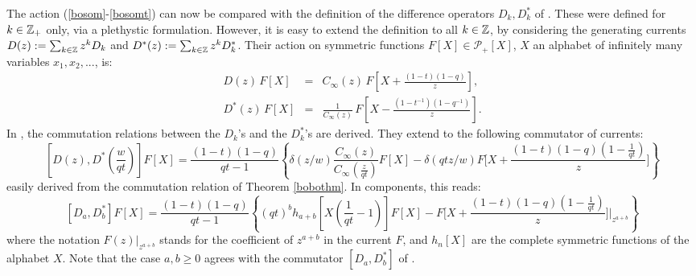 The action (\ref{bosom}-\ref{bosomt}) can now be compared with the definition of the difference operators $D_k,D_k^*$ of \cite {BGLX}. These were 
defined for $k\in {\mathbb Z}_+$ only, via a plethystic formulation. However, it is easy to extend the definition to
all $k\in {\mathbb Z}$, by considering the  
generating currents $D(z):=\sum_{k\in {\mathbb Z}} z^k D_k$ and $D^*(z):=\sum_{k\in {\mathbb Z}} z^k D_k^*$. 
Their action on symmetric functions $F[X]\in {\mathcal P}_+[X]$, $X$
an alphabet
of infinitely many variables $x_1,x_2,...$, is:
\begin{eqnarray}
D(z)\, F[X]&=&C_\infty(z)\, F\left[X+\frac{(1-t)(1-q)}{z}\right] \label{fromBG}, \\
D^*(z)\, F[X]&=&\frac{1}{C_\infty(z)}\, F\left[X-\frac{(1-t^{-1})(1-q^{-1})}{z}\right] .\label{fromBGstar} 
\end{eqnarray}
In \cite{BGLX}, the commutation relations between the $D_k$'s and the $D_k^*$'s are derived. 
They extend to the following commutator of currents:
\begin{equation}\label{BGcurrent}
[D(z),D^*(\frac{w}{q t})]F[X]=
\frac{(1-t)(1-q)}{q t-1} \left\{\delta(z/w)\frac{C_\infty(z)}{C_\infty(\frac{z}{q t})}F[X]-
\delta(q tz/w)F\Big[ X+\frac{(1-t)(1-q)(1-\frac{1}{qt})}{z}\Big] \right\}
\end{equation}
easily derived from the commutation relation of Theorem \ref{bobothm}.
In components, this reads:
$$[D_a,D_b^*]F[X]=\frac{(1-t)(1-q)}{q t-1} \left\{(qt)^b h_{a+b}[X(\frac{1}{qt}-1)]F[X]-
F\Big[ X+\frac{(1-t)(1-q)(1-\frac{1}{qt})}{z}\Big]\vert_{z^{a+b}} \right\}$$
where the notation $F(z)\vert_{z^{a+b}}$ stands for the coefficient of $z^{a+b}$ in the current $F$,
and $h_n[X]$ are the complete symmetric functions of the alphabet $X$.
Note that the case $a,b\geq 0$ agrees with the commutator $[D_a,D_b^*]$ of \cite{BGLX}.


